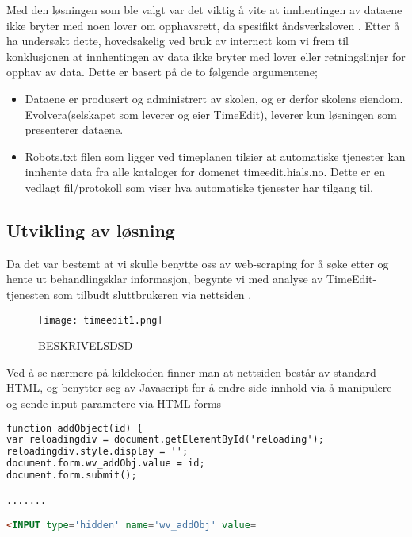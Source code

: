 \documentclass[../main.tex]{subfiles}
\begin{document}
Med den løsningen som ble valgt var det viktig å vite at innhentingen av dataene ikke bryter med noen lover om opphavsrett, da spesifikt åndsverksloven .
Etter å ha undersøkt dette, hovedsakelig ved bruk av internett kom vi frem til konklusjonen at innhentingen av data ikke bryter med lover eller retningslinjer for opphav av data. Dette er basert på de to følgende argumentene;

\begin{itemize}
\item Dataene er produsert og administrert av skolen, og er derfor skolens eiendom. Evolvera(selskapet som leverer og eier TimeEdit), leverer kun løsningen som presenterer dataene.
\item Robots.txt filen som ligger ved timeplanen tilsier at automatiske tjenester kan innhente data fra alle kataloger for domenet timeedit.hials.no. Dette er en vedlagt fil/protokoll som viser hva automatiske tjenester har tilgang til.
\end{itemize}



\subsection{Utvikling av løsning}

Da det var bestemt at vi skulle benytte oss av web-scraping for å søke etter og hente ut behandlingsklar informasjon, begynte vi med analyse av TimeEdit-tjenesten som tilbudt sluttbrukeren via nettsiden .

\begin{figure}[H]
  \centering
  \texttt{[image: timeedit1.png]}
  \caption{BESKRIVELSDSD}
\end{figure}

Ved å se nærmere på kildekoden finner man at nettsiden består av standard HTML, og benytter seg av Javascript for å endre side-innhold via å manipulere og sende input-parametere via HTML-forms

\begin{lstlisting}[language=HTML, frame=single, caption={Kildekode tatt fra TimeEdit-systemet benyttet av HIA}]
function addObject(id) {
var reloadingdiv = document.getElementById('reloading');
reloadingdiv.style.display = '';
document.form.wv_addObj.value = id;
document.form.submit();

.......

<INPUT type='hidden' name='wv_addObj' value=
\end{lstlisting}
\end{document}
